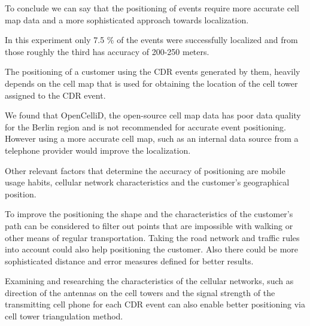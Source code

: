 To conclude we can say that the positioning of events require more accurate cell map data and a more sophisticated approach towards localization. 

In this experiment only 7.5 \% of the events were successfully localized and from those roughly the third has accuracy of 200-250 meters. 

The positioning of a customer using the CDR events generated by them, heavily depends on the cell map that is used for obtaining the location of the cell tower assigned to the CDR event. 

We found that OpenCelliD, the open-source cell map data has poor data quality for the Berlin region and is not recommended for accurate event positioning. However using a more accurate cell map, such as an internal data source from a telephone provider would improve the localization.

Other relevant factors that determine the accuracy of positioning are mobile usage habits, cellular network characteristics and the customer's geographical position.

To improve the positioning the shape and the characteristics of the customer's path can be considered to filter out points that are impossible with walking or other means of regular transportation. Taking the road network and traffic rules into account could also help positioning the customer. Also there could be more sophisticated distance and error measures defined for better results.

Examining and researching the characteristics of the cellular networks, such as direction of the antennas on the cell towers and the signal strength of the transmitting cell phone for each CDR event can also enable better positioning via cell tower triangulation method. 
